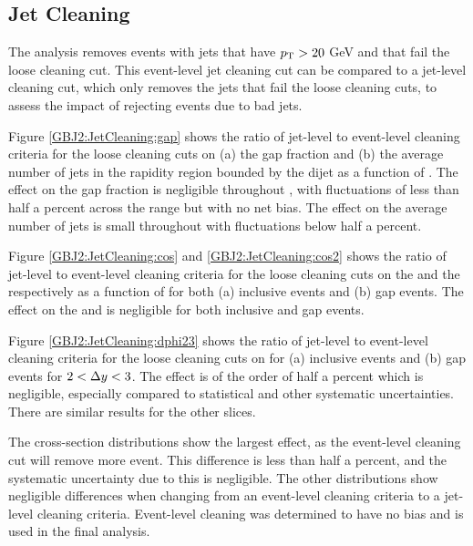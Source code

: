 \subsection{Jet Cleaning}
\label{sec:GBJ2:Cleaning}

The analysis removes events with jets that have $\mbox{$p_{\rm T}$}{}>20$ GeV  and that fail the loose cleaning cut.
This event-level jet cleaning cut can be compared to a jet-level cleaning cut, which only removes the jets that fail the loose cleaning cuts, to assess the impact of rejecting events due to bad jets.



Figure \ref{GBJ2:JetCleaning:gap} shows the ratio of jet-level to event-level cleaning criteria for the loose cleaning cuts on (a) the gap fraction and (b) the average number of jets in the rapidity region bounded by the dijet as a function of \dy{}.
The effect on the gap fraction is negligible throughout \dy{}, with fluctuations of less than half a percent across the \dy{} range but with no net bias.
The effect on the average number of jets is small throughout \dy{} with fluctuations below half a percent.

Figure \ref{GBJ2:JetCleaning:cos} and \ref{GBJ2:JetCleaning:cos2} shows the ratio of jet-level to event-level cleaning criteria for the loose cleaning cuts  on the \mean{\cosdphi{}} and the \mean{\costwodphi{}} respectively as a function of \dy{} for both (a) inclusive events and (b) gap events.
The effect on the \mean{\cosdphi{}} and \mean{\costwodphi{}} is negligible for both inclusive and gap events.

Figure \ref{GBJ2:JetCleaning:dphi23} shows the ratio of jet-level to event-level cleaning criteria for the loose cleaning cuts on \dphiDist{} for (a) inclusive events and (b) gap events for $2<\mbox{$\Delta y$}{}<3$. 
The effect is of the order of half a percent which is negligible, especially compared to statistical and other systematic uncertainties.
There are similar results for the other \dy{} slices.

The cross-section distributions show the largest effect, as the event-level cleaning cut will remove more event. 
This difference is less than half a percent, and the systematic uncertainty due to this is negligible.
The other distributions show negligible differences when changing from an event-level cleaning criteria to a jet-level cleaning criteria. 
Event-level cleaning was determined to have no bias and is used in the final analysis. 





